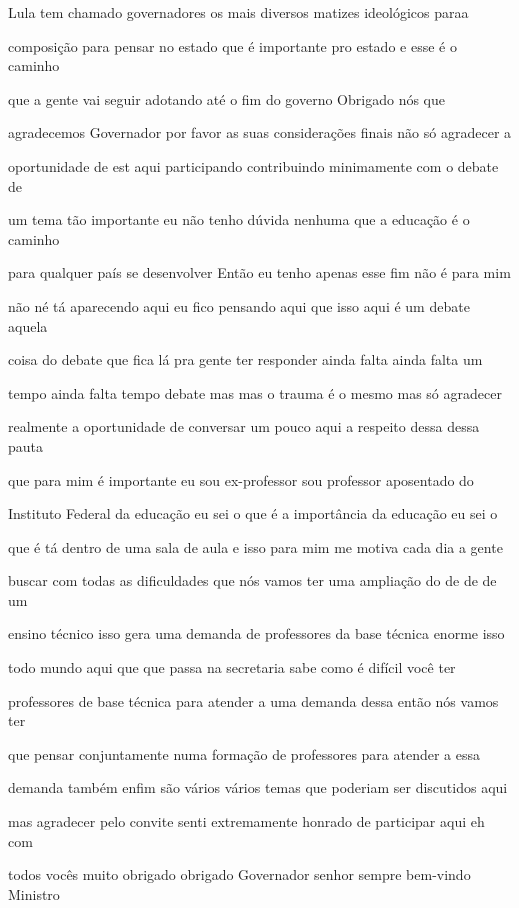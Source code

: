 \documentclass[a4paper,12pt]{article}
\begin{document}
Lula tem chamado governadores os mais diversos matizes ideológicos paraa

composição para pensar no estado que é importante pro estado e esse é o caminho

que a gente vai seguir adotando até o fim do governo Obrigado nós que

agradecemos Governador por favor as suas considerações finais não só agradecer a

oportunidade de est aqui participando contribuindo minimamente com o debate de

um tema tão importante eu não tenho dúvida nenhuma que a educação é o caminho

para qualquer país se desenvolver Então eu tenho apenas esse fim não é para mim

não né tá aparecendo aqui eu fico pensando aqui que isso aqui é um debate aquela

coisa do debate que fica lá pra gente ter responder ainda falta ainda falta um

tempo ainda falta tempo debate mas mas o trauma é o mesmo mas só agradecer

realmente a oportunidade de conversar um pouco aqui a respeito dessa dessa pauta

que para mim é importante eu sou ex-professor sou professor aposentado do

Instituto Federal da educação eu sei o que é a importância da educação eu sei o

que é tá dentro de uma sala de aula e isso para mim me motiva cada dia a gente

buscar com todas as dificuldades que nós vamos ter uma ampliação do de de de um

ensino técnico isso gera uma demanda de professores da base técnica enorme isso

todo mundo aqui que que passa na secretaria sabe como é difícil você ter

professores de base técnica para atender a uma demanda dessa então nós vamos ter

que pensar conjuntamente numa formação de professores para atender a essa

demanda também enfim são vários vários temas que poderiam ser discutidos aqui

mas agradecer pelo convite senti extremamente honrado de participar aqui eh com

todos vocês muito obrigado obrigado Governador senhor sempre bem-vindo Ministro
\end{document}
